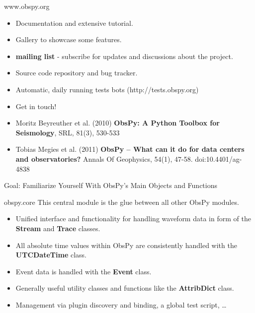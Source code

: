 \documentclass[handout]{beamer}
\begin{document}
\begin{frame}[plain]{www.obspy.org}
    \begin{itemize}
        \item Documentation and extensive tutorial.
        \item Gallery to showcase some features.
        \item \textbf{mailing list} - subscribe for updates and discussions about the project.
        \item Source code repository and bug tracker.
        \item Automatic, daily running tests bots (http://tests.obspy.org)
        \item Get in touch!
    \end{itemize}

    \vspace{2em}

    \small
    \begin{itemize}
        \item Moritz Beyreuther et al. (2010) \textbf{ObsPy: A Python Toolbox for Seismology}, SRL, 81(3), 530-533
        \item Tobias Megies et al. (2011) \textbf{ObsPy – What can it do for data centers and observatories?} Annals Of Geophysics, 54(1), 47-58. doi:10.4401/ag-4838
    \end{itemize}
\end{frame}




\begin{frame}{}
    \begin{center}
        \textcolor{lmu@darkgreen}{\LARGE{Goal: Familiarize Yourself With ObsPy's Main Objects and Functions}}
    \end{center}
\end{frame}


\begin{frame}{obspy.core}
This central module is the glue between all other ObsPy modules.

    \begin{itemize}
        \item Unified interface and functionality for handling waveform data in
            form of the \textbf{Stream} and \textbf{Trace} classes.
        \item All absolute time values within ObsPy are consistently handled
            with the \textbf{UTCDateTime} class.
        \item Event data is handled with the \textbf{Event} class.
        \item Generally useful utility classes and functions like the
            \textbf{AttribDict} class.
        \item Management via plugin discovery and binding, a global test
            script, \ldots
    \end{itemize}
\end{frame}
\end{document}
